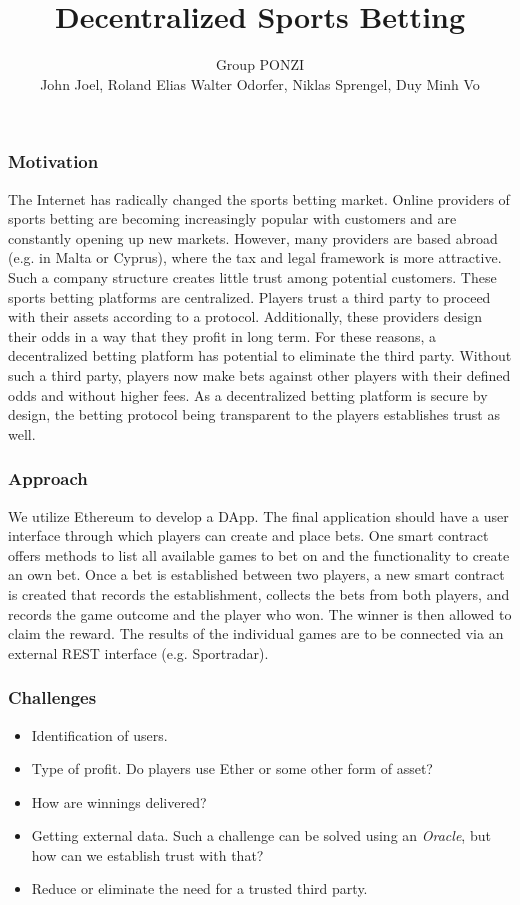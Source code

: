 \documentclass[a4paper, 10pt]{article}
\title{\vspace{-4cm}{\small Project proposal\\}Decentralized Sports Betting}
\author{Group PONZI\\John Joel, Roland Elias Walter Odorfer, Niklas Sprengel, Duy Minh Vo}
\date{}
\begin{document}
\maketitle
\thispagestyle{empty}

\subsubsection*{Motivation}

The Internet has radically changed the sports betting market.
Online providers of sports betting are becoming increasingly popular with customers and are constantly opening up new markets.
However, many providers are based abroad (e.g. in Malta or Cyprus), where the tax and legal framework is more attractive.
Such a company structure creates little trust among potential customers.
These sports betting platforms are centralized.
Players trust a third party to proceed with their assets according to a protocol.
Additionally, these providers design their odds in a way that they profit in long term.
For these reasons, a decentralized betting platform has potential to eliminate the third party.
Without such a third party, players now make bets against other players with their defined odds and without higher fees.
As a decentralized betting platform is secure by design, the betting protocol being transparent to the players establishes trust as well.

\subsubsection*{Approach}

We utilize Ethereum to develop a DApp.
The final application should have a user interface through which players can create and place bets.
One smart contract offers methods to list all available games to bet on and the functionality to create an own bet.
Once a bet is established between two players, a new smart contract is created that records the establishment, collects the bets from both players, and records the game outcome and the player who won.
The winner is then allowed to claim the reward.
The results of the individual games are to be connected via an external REST interface (e.g. Sportradar).

\subsubsection*{Challenges}
\begin{itemize}
  \item Identification of users.
  \item Type of profit. Do players use Ether or some other form of asset?
  \item How are winnings delivered?
  \item Getting external data. Such a challenge can be solved using an \emph{Oracle}, but how can we establish trust with that?
  \item Reduce or eliminate the need for a trusted third party.
\end{itemize}
\end{document}
